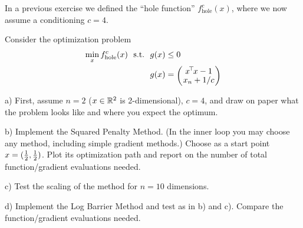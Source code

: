 





In a previous exercise we defined the ``hole function''
$f^c_{\text{hole}}(x)$, where we now assume a conditioning $c=4$.

Consider the optimization problem
\begin{align}
\min_x f^c_{\text{hole}}(x) \st& g(x) \le 0 \\
& g(x) = \mat{c}{x^\T x - 1 \\ x_n + 1/c}
\end{align}

a) First, assume $n=2$ ($x\in{\mathbb{R}}^2$ is 2-dimensional), $c=4$, and
draw on paper what the problem looks like and where you expect the
optimum.

b) Implement the Squared Penalty Method. (In the inner loop you may
choose any method, including simple gradient methods.) Choose as a
start point $x=(\frac{1}{2}, \frac{1}{2})$. Plot its optimization path and report
on the number of total function/gradient evaluations needed.

c) Test the scaling of the method for $n=10$ dimensions.

d) Implement the Log Barrier Method and test as in b) and
c). Compare the function/gradient evaluations needed.








\exerfoot
